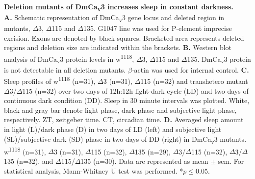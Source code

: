 \label{fig:S2}
\textbf{Deletion mutants of DmCa\textsubscript{v}3 increases sleep in constant darkness.}
\\
\textbf{A.} Schematic representation of DmCa\textsubscript{v}3 gene locus and deleted region in mutants, $\Delta$3, $\Delta$115 and $\Delta$135.
G1047 line was used for P-element imprecise excision.
Exons are denoted by black squares.
Bracketed area represents deleted regions and deletion size are indicated within the brackets.
\textbf{B.} Western blot analysis of DmCa\textsubscript{v}3 protein levels in w\textsuperscript{1118}, $\Delta$3, $\Delta$115 and $\Delta$135.
DmCa\textsubscript{v}3 protein is not detectable in all deletion mutants.
$\beta$-actin was used for internal control.
\textbf{C.} Sleep profiles of w\textsuperscript{1118} (n=31), $\Delta$3 (n=31), $\Delta$115 (n=32) and transhetero mutant $\Delta$3/$\Delta$115 (n=32) over two days of 12h:12h light-dark cycle (LD) and two days of continuous dark condition (DD).
Sleep in 30 minute intervals was plotted.
White, black and gray bar denote light phase, dark phase and subjective light phase, respectively.
ZT, zeitgeber time.
CT, circadian time.
\textbf{D.} Averaged sleep amount in light (L)/dark phase (D) in two days of LD (left) and subjective light (SL)/subjective dark (SD) phase in two days of DD (right) in DmCa\textsubscript{v}3 mutants.
w\textsuperscript{1118} (n=31), $\Delta$3 (n=31), $\Delta$115 (n=32), $\Delta$135 (n=29), $\Delta$3/$\Delta$115 (n=32), $\Delta$3/$\Delta$135 (n=32), and $\Delta$115/$\Delta$135 (n=30).
Data are represented as mean $\pm$ sem.
For statistical analysis, Mann-Whitney U test was performed.
*$p\le$0.05.
  
